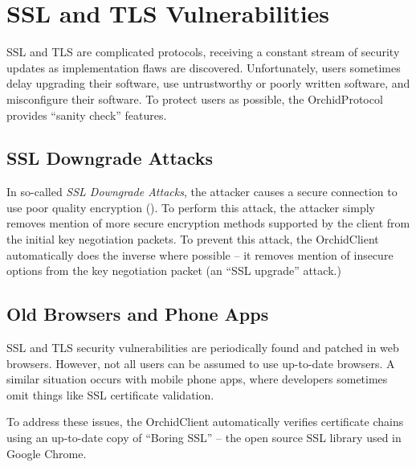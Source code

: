 \documentclass{article}
\newcommand{\orchid}{Orchid}
\newcommand{\Orchid}{\orchid}
\begin{document}
\section{SSL and TLS Vulnerabilities}

SSL and TLS are complicated protocols, receiving a constant stream of
security updates as implementation flaws are discovered.
Unfortunately, users sometimes delay upgrading their software, use
untrustworthy or poorly written software, and misconfigure their
software. To protect users as possible, the \Orchid Protocol provides
``sanity check'' features.

\subsection{SSL Downgrade Attacks}

In so-called \emph{SSL Downgrade Attacks}, the attacker causes a
secure connection to use poor quality encryption
(). To perform this attack, the attacker simply
removes mention of more secure encryption methods supported by the
client from the initial key negotiation packets. To prevent this
attack, the \Orchid Client automatically does the inverse where
possible -- it removes mention of insecure options from the key
negotiation packet (an ``SSL upgrade'' attack.)

\subsection{Old Browsers and Phone Apps}

SSL and TLS security vulnerabilities are periodically found and
patched in web browsers. However, not all users can be assumed to use
up-to-date browsers. A similar situation occurs with mobile phone
apps, where developers sometimes omit things like SSL certificate
validation.

To address these issues, the \Orchid Client automatically verifies
certificate chains using an up-to-date copy of ``Boring SSL'' -- the
open source SSL library used in Google Chrome.



\end{document}
